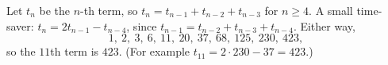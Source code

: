 Let $t_n$ be the $n$-th term, so $t_n=t_{n-1}+t_{n-2}+t_{n-3}$ for $n\ge4$. A small time-saver: $t_{n}=2t_{n-1}-t_{n-4}$, since $t_{n-1}=t_{n-2}+t_{n-3}+t_{n-4}$. Either way,
\[
1,\ 2,\ 3,\ 6,\ 11,\ 20,\ 37,\ 68,\ 125,\ 230,\ 423,
\]
so the $11$th term is $\boxed{423}$. (For example $t_{11}=2\cdot230-37=423$.)

